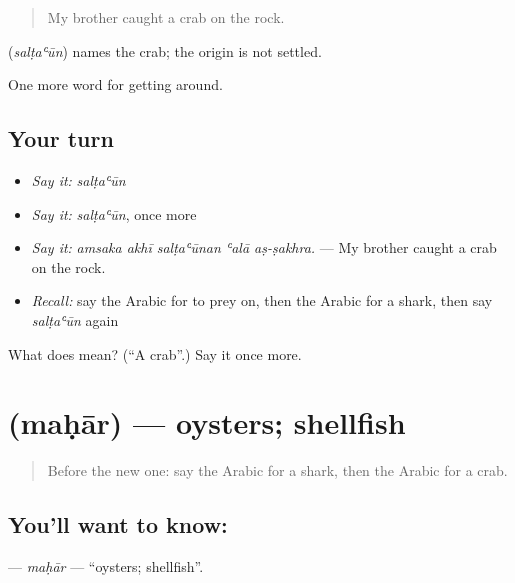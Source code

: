 \begin{quote}
My brother caught a crab on the rock.
\end{quote}

\begin{cousinweb}
\textbf{} (\emph{salṭaʿūn}) names the crab; the origin is not settled.
\end{cousinweb}

\begin{grammarlens}[title={What you've built}]
One more word for getting around.
\end{grammarlens}

\subsection*{Your turn}
\begin{itemize}
\raggedright
  \item \emph{Say it:} \emph{salṭaʿūn}
  \item \emph{Say it:} \emph{salṭaʿūn}, once more
  \item \emph{Say it:} \emph{amsaka akhī salṭaʿūnan ʿalā aṣ-ṣakhra.} — My brother caught a crab on the rock.
  \item \emph{Recall:} say the Arabic for to prey on, then the Arabic for a shark, then say \emph{salṭaʿūn} again
\end{itemize}

\begin{tcolorbox}[breakable,colback=teal!4,colframe=teal!35!black,title={Before you move on}]
What does  mean? (\textquotedblleft{}A crab\textquotedblright{}.) Say it once more.
\end{tcolorbox}
\section[\texorpdfstring{\ar{محار} (maḥār)}{محار (maḥār)}]{ (maḥār) — oysters; shellfish}

\label{lesson:AR-C477-mahar}



\begin{quote}
Before the new one: say the Arabic for a shark, then the Arabic for a crab.
\end{quote}

\subsection*{You'll want to know: }
\textbf{} — \emph{maḥār} — \textquotedblleft{}oysters; shellfish\textquotedblright{}.

